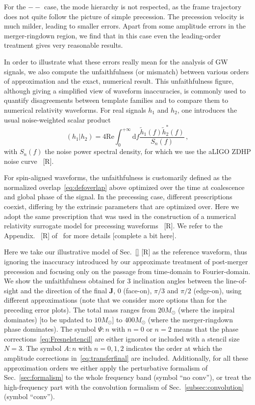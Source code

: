 \documentclass[aps,showpacs,twocolumn,
prd,superscriptaddress,nofootinbib]{revtex4-1}
\newcommand{\be}{\begin{equation}}
\newcommand{\ee}{\end{equation}}
\newcommand\ud{{\mathrm{d}}}
\newcommand{\Msol}{M_{\odot}}
\newcommand{\SM}[1]{{\color{Red} #1}}
\begin{document}
For the $--$ case, the mode hierarchy is not respected, as the frame trajectory does not quite follow the picture of simple precession. The precession velocity is much milder, leading to smaller errors. Apart from some amplitude errors in the merger-ringdown region, we find that in this case even the leading-order treatment gives very reasonable results.

In order to illustrate what these errors really mean for the analysis of GW signals, we also compute the unfaithfulness (or mismatch) between various orders of approximation and the exact, numerical result. This unfaithfulness figure, although giving a simplified view of waveform inaccuracies, is commonly used to quantify disagreements between template families and to compare them to numerical relativity waveforms. For real signals $h_{1}$ and $h_{2}$, one introduces the usual noise-weighted scalar product
\be\label{eq:defoverlap}
	\left( h_{1} | h_{2} \right) = 4\text{Re} \int_{0}^{+\infty} \ud f \frac{\tilde{h}_{1}(f) \tilde{h}_{2}^{*}(f)}{S_{n}(f)} \,,
\ee
with $S_{n}(f)$ the noise power spectral density, for which we use the aLIGO ZDHP noise curve~\cite{} \SM{[R]}.

For spin-aligned waveforms, the unfaithfulness is customarily defined as the normalized overlap~\eqref{eq:defoverlap} above optimized over the time at coalescence and global phase of the signal. In the precessing case, different prescriptions coexist, differing by the extrinsic parameters that are optimized over. Here we adopt the same prescription that was used in the construction of a numerical relativity surrogate model for precessing waveforms~\cite{} \SM{[R]}. We refer to the Appendix.~\SM{[R]} of~\cite{} for more details \SM{[complete a bit here]}.

Here we take our illustrative model of Sec.~\ref{} \SM{[R]} as the reference waveform, thus ignoring the inaccuracy introduced by our approximate treatment of post-merger precession and focusing only on the passage from time-domain to Fourier-domain. We show the unfaithfulness obtained for 3 inclination angles between the line-of-sight and the direction of the final $\bm{J}$, $0$ (face-on), $\pi/3$ and $\pi/2$ (edge-on), using different approximations (note that we consider more options than for the preceding error plots). The total mass ranges from $20\Msol$ (where the inspiral dominates) \SM{[to be updated to $10 \Msol$]} to $400\Msol$ (where the merger-ringdown phase dominates). The symbol $\Psi:n$ with $n=0$ or $n=2$ means that the phase corrections~\eqref{eq:Fresnelstencil} are either ignored or included with a stencil size $N=3$. The symbol $A:n$ with $n=0,1,2$ indicates the order at which the amplitude corrections in~\eqref{eq:transferfinal} are included. Additionally, for all these approximation orders we either apply the perturbative formalism of Sec.~\ref{sec:formalism} to the whole frequency band (symbol ``no conv''), or treat the high-frequency part with the convolution formalism of Sec.~\ref{subsec:convolution} (symbol ``conv''). 
\end{document}
